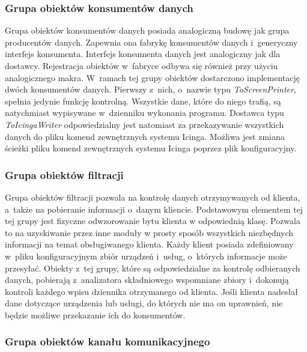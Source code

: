 \subsubsection[Grupa obiektów konsumentów danych][Grupa obiektów
konsumentów danych]{Grupa obiektów konsumentów danych}

Grupa obiektów konsumentów danych posiada analogiczną budowę jak grupa
producentów danych. Zapewnia ona fabrykę konsumentów danych
i~generyczny interfejs konsumenta. Interfejs konsumenta danych jest
analogiczny jak dla dostawcy. Rejestracja obiektów w~fabryce odbywa
się również przy użyciu analogicznego makra. W~ramach tej grupy
obiektów dostarczono implementację dwóch konsumentów danych. Pierwszy
z~nich, o~nazwie typu {\em ToScreenPrinter}, spełnia jedynie funkcję
kontrolną. Wszystkie dane, które do niego trafią, są natychmiast
wypisywane w~dzienniku wykonania programu. Dostawca typu {\em
  ToIcingaWriter} odpowiedzialny jest natomiast za przekazywanie
wszystkich danych do pliku komend zewnętrznych systemu Icinga. Możliwa
jest zmiana ścieżki pliku komend zewnętrznych systemu Icinga poprzez
plik konfiguracyjny.

\subsubsection[Grupa obiektów filtracji][Grupa obiektów
filtracji]{Grupa obiektów filtracji}

Grupa obiektów filtracji pozwala na kontrolę danych otrzymywanych od
klienta, a~także na pobieranie informacji o~danym
kliencie. Podstawowym elementem tej tej grupy jest fizyczne
odwzorowanie bytu klienta w odpowiednią klasę. Pozwala to na
uzyskiwanie przez inne moduły w prosty sposób wszystkich niezbędnych
informacji na temat obsługiwanego klienta. Każdy klient posiada
zdefiniowany w~pliku konfiguracyjnym zbiór urządzeń i~usług, o~których
informacje może przesyłać. Obiekty z~tej grupy, które są
odpowiedzialne za kontrolę odbieranych danych, pobierają z~analizatora
składniowego wspomniane zbiory i~dokonują kontroli każdego wpisu
dziennika otrzymanego od klienta. Jeśli klienta nadesłał dane
dotyczące urządzenia lub usługi, do których nie ma on uprawnień, nie
będzie możliwe przekazanie ich do konsumentów.

\subsubsection[Grupa obiektów kanału komunikacyjnego][Grupa obiektów
kanału komunikacyjnego]{Grupa obiektów kanału komunikacyjnego}

